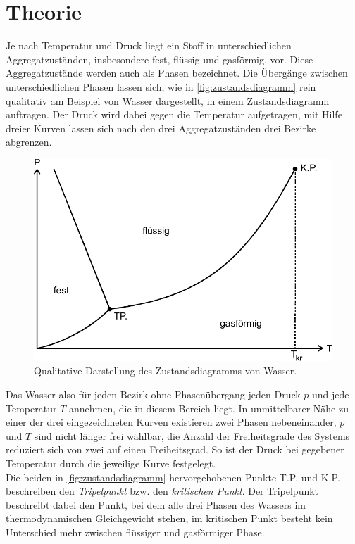 \section{Theorie}
\label{sec:Theorie}

Je nach Temperatur und Druck liegt ein Stoff in unterschiedlichen Aggregatzuständen, insbesondere fest, flüssig und gasförmig, vor. 
Diese Aggregatzustände werden auch als Phasen bezeichnet.
Die Übergänge zwischen unterschiedlichen Phasen lassen sich, wie in \autoref{fig:zustandsdiagramm} rein qualitativ am Beispiel von Wasser dargestellt, in einem Zustandsdiagramm auftragen.
Der Druck wird dabei gegen die Temperatur aufgetragen, mit Hilfe dreier Kurven lassen sich nach den drei Aggregatzuständen drei Bezirke abgrenzen.

\begin{figure}
    \centering
    \includegraphics{Zustandsdiagramm.pdf}
    \caption{Qualitative Darstellung des Zustandsdiagramms von Wasser\cite{ap06}.}
    \label{fig:zustandsdiagramm}
\end{figure}

Das Wasser also für jeden Bezirk ohne Phasenübergang jeden Druck $p$ und jede Temperatur $T$ annehmen, die in diesem Bereich liegt.
In unmittelbarer Nähe zu einer der drei eingezeichneten Kurven existieren zwei Phasen nebeneinander, $p$ und $T$ sind nicht länger frei wählbar, die Anzahl der Freiheitsgrade des Systems reduziert sich von zwei auf einen Freiheitsgrad.
So ist der Druck bei gegebener Temperatur durch die jeweilige Kurve festgelegt. \\

Die beiden in \autoref{fig:zustandsdiagramm} hervorgehobenen Punkte T.P. und K.P. beschreiben den \textit{Tripelpunkt} bzw. den \textit{kritischen Punkt}.
Der Tripelpunkt beschreibt dabei den Punkt, bei dem alle drei Phasen des Wassers im thermodynamischen Gleichgewicht stehen, im kritischen Punkt besteht kein Unterschied mehr zwischen flüssiger und gasförmiger Phase. \\

